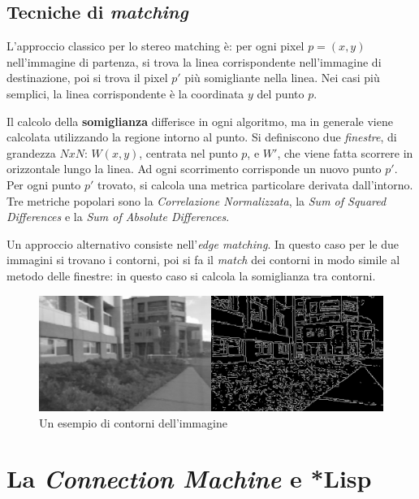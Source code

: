 \documentclass[12pt,a4paper,openright,twoside]{report}
\begin{document}
\section{Tecniche di \textit{matching}}

L'approccio classico per lo stereo matching è: per ogni pixel $p = (x, y)$ nell'immagine di partenza, si trova la linea corrispondente nell'immagine di destinazione, poi si trova il pixel $p'$ più somigliante nella linea. Nei casi più semplici, la linea corrispondente è la coordinata $y$ del punto $p$.

Il calcolo della \textbf{somiglianza} differisce in ogni algoritmo, ma in generale viene calcolata utilizzando la regione intorno al punto. Si definiscono due \textit{finestre}, di grandezza $NxN$: $W (x, y)$, centrata nel punto $p$, e $W'$, che viene fatta scorrere in orizzontale lungo la linea. Ad ogni scorrimento corrisponde un nuovo punto $p'$. Per ogni punto $p'$ trovato, si calcola una metrica particolare derivata dall'intorno. Tre metriche popolari sono la \textit{Correlazione Normalizzata}, la \textit{Sum of Squared Differences} e la \textit{Sum of Absolute Differences}.

Un approccio alternativo consiste nell'\textit{edge matching}. In questo caso per le due immagini si trovano i contorni, poi si fa il \textit{match} dei contorni in modo simile al metodo delle finestre: in questo caso si calcola la somiglianza tra contorni.

\begin{figure}[h]
    \centering
    \includegraphics[width=\textwidth]{contours.png}
    \caption{Un esempio di contorni dell'immagine}
    \label{img:contours}
\end{figure}




\chapter{La \textit{Connection Machine} e *Lisp}
\end{document}
